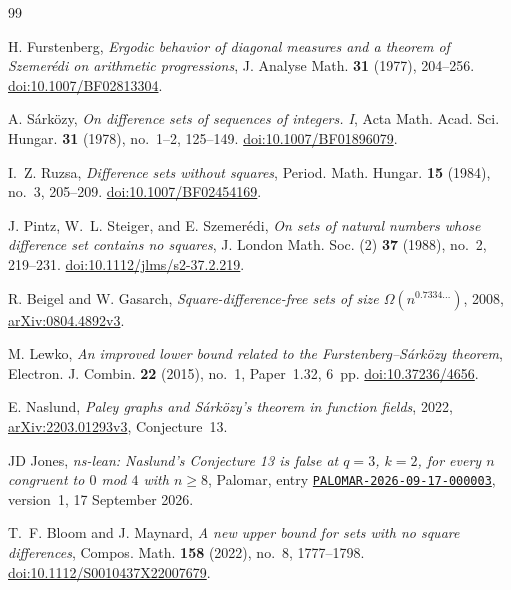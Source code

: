 \documentclass[11pt]{article}
\theoremstyle{definition}
\theoremstyle{remark}
\begin{document}
\begingroup
\raggedright
\begin{thebibliography}{99}

H. Furstenberg,
\emph{Ergodic behavior of diagonal measures and a theorem of
Szemer\'edi on arithmetic progressions},
J. Analyse Math. \textbf{31} (1977), 204--256.
\href{https://doi.org/10.1007/BF02813304}{doi:10.1007/BF02813304}.

A. S\'ark\"ozy,
\emph{On difference sets of sequences of integers. I},
Acta Math. Acad. Sci. Hungar. \textbf{31} (1978), no.~1--2, 125--149.
\href{https://doi.org/10.1007/BF01896079}{doi:10.1007/BF01896079}.

I.~Z. Ruzsa, \emph{Difference sets without squares},
Period. Math. Hungar. \textbf{15} (1984), no.~3, 205--209.
\href{https://doi.org/10.1007/BF02454169}{doi:10.1007/BF02454169}.

J. Pintz, W.~L. Steiger, and E. Szemer\'edi,
\emph{On sets of natural numbers whose difference set contains no squares},
J. London Math. Soc. (2) \textbf{37} (1988), no.~2, 219--231.
\href{https://doi.org/10.1112/jlms/s2-37.2.219}{doi:10.1112/jlms/s2-37.2.219}.

R. Beigel and W. Gasarch,
\emph{Square-difference-free sets of size $\Omega(n^{0.7334\ldots})$},
2008, \href{https://arxiv.org/abs/0804.4892v3}{arXiv:0804.4892v3}.

M. Lewko,
\emph{An improved lower bound related to the
Furstenberg--S\'ark\"ozy theorem},
Electron. J. Combin. \textbf{22} (2015), no.~1, Paper~1.32, 6~pp.
\href{https://doi.org/10.37236/4656}{doi:10.37236/4656}.

E. Naslund,
\emph{Paley graphs and S\'ark\"ozy's theorem in function fields},
2022, \href{https://arxiv.org/abs/2203.01293v3}{arXiv:2203.01293v3},
Conjecture~13.

JD Jones,
\emph{ns-lean: Naslund's Conjecture 13 is false at $q=3$, $k=2$, for every
$n$ congruent to $0$ mod $4$ with $n\ge8$},
Palomar, entry
\href{https://palomar-registry.org/entry?id=PALOMAR-2026-09-17-000003\&version=1}{\texttt{PALOMAR-2026-09-17-000003}},
version~1, 17 September 2026.

T.~F. Bloom and J. Maynard,
\emph{A new upper bound for sets with no square differences},
Compos. Math. \textbf{158} (2022), no.~8, 1777--1798.
\href{https://doi.org/10.1112/S0010437X22007679}{doi:10.1112/S0010437X22007679}.


\end{thebibliography}
\end{document}
